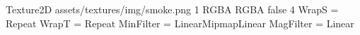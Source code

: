 Texture2D
assets/textures/img/smoke.png
1
RGBA
RGBA
false
4
WrapS = Repeat
WrapT = Repeat
MinFilter = LinearMipmapLinear
MagFilter = Linear
